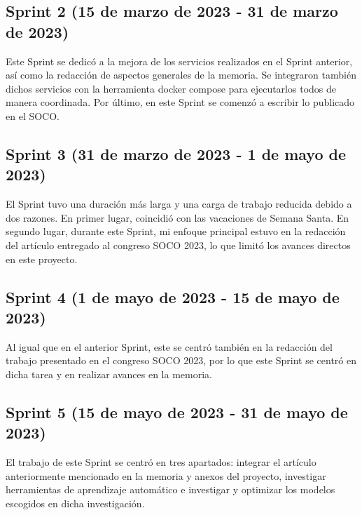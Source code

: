 
\subsection{Sprint 2 (15 de marzo de 2023 - 31 de marzo de 2023)}

Este Sprint se dedicó a la mejora de los servicios realizados en el Sprint anterior, así como la redacción de aspectos 
generales de la memoria. Se integraron también dichos servicios con la herramienta docker compose para ejecutarlos todos 
de manera coordinada. Por último, en este Sprint se comenzó a escribir lo publicado en el SOCO.


\subsection{Sprint 3 (31 de marzo de 2023 - 1 de mayo de 2023)}

El Sprint tuvo una duración más larga y una carga de trabajo reducida debido a dos razones. En primer lugar, coincidió 
con las vacaciones de Semana Santa. En segundo lugar, durante este Sprint, mi enfoque principal estuvo en la 
redacción del artículo entregado al congreso SOCO 2023, lo que limitó los avances directos en este proyecto.


\subsection{Sprint 4 (1 de mayo de 2023 - 15 de mayo de 2023)}

Al igual que en el anterior Sprint, este se centró también en la redacción del trabajo presentado en el congreso SOCO 2023, por lo 
que este Sprint se centró en dicha tarea y en realizar avances en la memoria.


\subsection{Sprint 5 (15 de mayo de 2023 - 31 de mayo de 2023)}

El trabajo de este Sprint se centró en tres apartados: integrar el artículo anteriormente mencionado
en la memoria y anexos del proyecto, investigar herramientas de aprendizaje automático e investigar y optimizar 
los modelos escogidos en dicha investigación.

